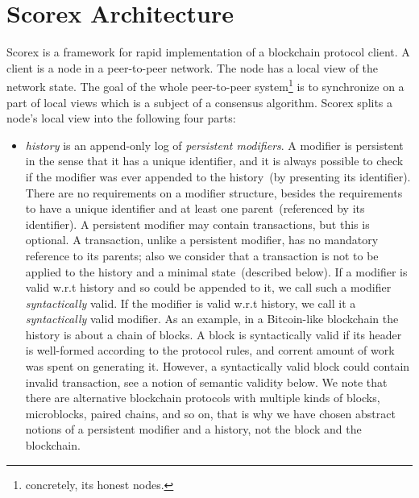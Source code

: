 
\section{Scorex Architecture}
\label{sec:scorex}

Scorex is a framework for rapid implementation of a blockchain protocol client. A client is a node in a peer-to-peer network. The node has a local view of the network state. The goal of the whole peer-to-peer system\footnote{concretely, its honest nodes.} is to synchronize on a part of local views which is a subject of a consensus algorithm. Scorex splits a node's local view into the following four parts: 

\begin{itemize}
\item{\em history} is an append-only log of {\em persistent modifiers}. A modifier is persistent in the sense that it has a unique identifier, and it is always possible to check if the modifier was ever appended to the history~(by presenting its identifier). There are no requirements on a modifier structure, besides the requirements to have a unique identifier and at least one parent~(referenced by its identifier). A persistent modifier may contain transactions, but this is optional. A transaction, unlike a persistent modifier, has no mandatory reference to its parents; also we consider that a transaction is not to be applied to the history and a minimal state~(described below). If a modifier is valid w.r.t history and so could be appended to it, we call such a modifier {\em syntactically} valid. If the modifier is valid w.r.t history, we call it a {\em syntactically} valid modifier. As an example, in a Bitcoin-like blockchain the history is about a chain of blocks. A block is syntactically valid if its header is well-formed according to the protocol rules, and corrent amount of work was spent on generating it. However, a syntactically valid block could contain invalid transaction, see a notion of semantic validity below. We note that there are alternative blockchain protocols with multiple kinds of blocks, microblocks, paired chains, and so on, that is why we have chosen abstract notions of a persistent modifier and a history, not the block and the blockchain.   


\end{itemize}
